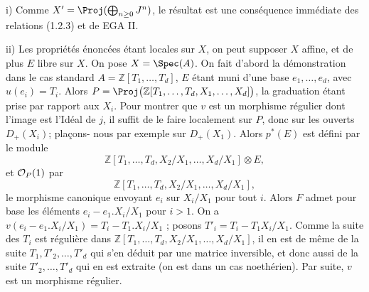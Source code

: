i) Comme \(X'=\Proj(\bigoplus_{n\ge0}J^n)\), le résultat est une conséquence immédiate des relations (1.2.3) et de EGA II.

ii) Les propriétés énoncées étant locales sur \(X\), on peut supposer \(X\) affine, et de plus \(E\) libre sur \(X\). On pose \(X=\Spec(A)\). On fait d'abord la démonstration dans le cas standard \(A=\mathbb Z[T_1,\ldots,T_d]\), \(E\) étant muni d'une base \(e_1,\ldots,e_d\), avec \(u(e_i)=T_i\). Alors \(P=\Proj\bigl(\mathbb Z[T_1,\ldots,T_d,X_1,\ldots,X_d]\bigr)\), la graduation étant prise par rapport aux \(X_i\). Pour montrer que \(v\) est un morphisme régulier dont l'image est l'Idéal de \(j\), il suffit de le faire localement sur \(P\), donc sur les ouverts \(D_+(X_i)\); plaçons-
nous par exemple sur \(D_+(X_1)\). Alors \(p^*(E)\) est défini par le module
\[
 \mathbb Z[T_1,\ldots,T_d,X_2/X_1,\ldots,X_d/X_1]\otimes E,
\]
et \(\mathcal O_P(1)\) par
\[
 \mathbb Z[T_1,\ldots,T_d,X_2/X_1,\ldots,X_d/X_1],
\]
le morphisme canonique envoyant \(e_i\) sur \(X_i/X_1\) pour tout \(i\). Alors \(F\) admet pour base les éléments \(e_i-e_1.X_i/X_1\) pour \(i>1\).
On a \(v(e_i-e_1.X_i/X_1)=T_i-T_1.X_i/X_1\) ; posons \(T'_i=T_i-T_1X_i/X_1\).
Comme la suite des \(T_i\) est régulière dans \(\mathbb Z[T_1,\ldots,T_d,X_2/X_1,\ldots,X_d/X_1]\), il en est de même de la suite \(T_1,T'_2,\ldots,T'_d\) qui s'en déduit par une matrice inversible, et donc aussi de la suite \(T'_2,\ldots,T'_d\) qui en est extraite (on est dans un cas noethérien). Par suite, \(v\) est un morphisme régulier.

